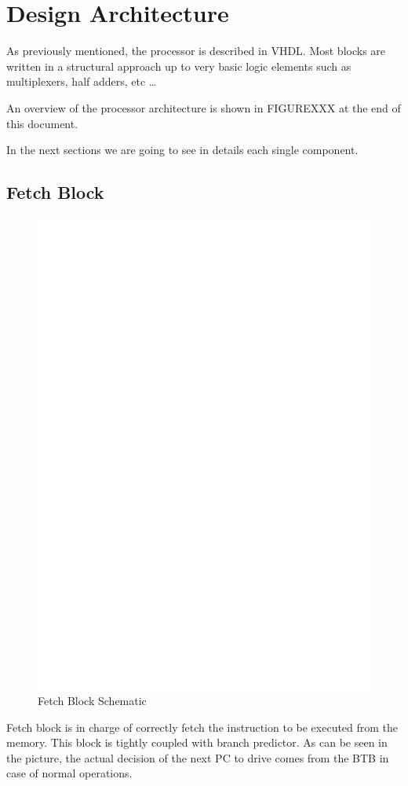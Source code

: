 \documentclass[12pt]{article}
\begin{document}
\section{Design Architecture}\label{Design}
As previously mentioned, the processor is described in VHDL. Most blocks are written in a structural approach up to very basic logic elements such as multiplexers, half adders, etc \ldots

An overview of the processor architecture is shown in FIGUREXXX at the end of this document.

In the next sections we are going to see in details each single component.

\subsection{Fetch Block}
\begin{figure}[h!]
	\includegraphics[width=\textwidth, center]{images/FETCH_BLOCK.eps}
	\caption{Fetch Block Schematic}
	\label{FETCHBLOCK}
\end{figure}
Fetch block is in charge of correctly fetch the instruction to be executed from the memory. This block is tightly coupled with branch predictor. As can be seen in the picture, the actual decision of the next PC to drive comes from the BTB in case of normal operations.
\end{document}
